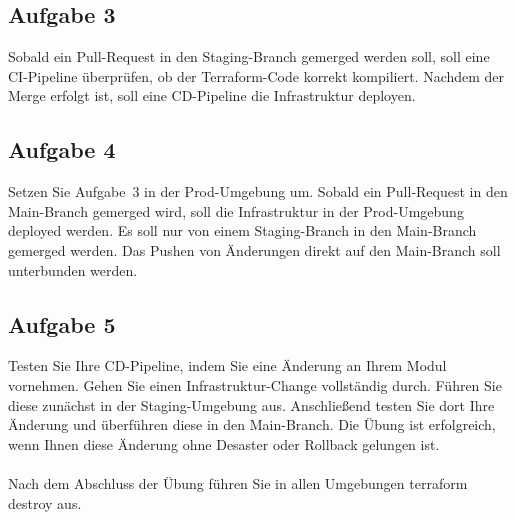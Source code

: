 \documentclass{article}
\begin{document}
    \subsection{Aufgabe 3}
    Sobald ein Pull-Request in den Staging-Branch gemerged werden soll, soll eine CI-Pipeline überprüfen, ob der Terraform-Code korrekt kompiliert.
    Nachdem der Merge erfolgt ist, soll eine CD-Pipeline die Infrastruktur deployen.

    \subsection{Aufgabe 4}
    Setzen Sie Aufgabe 3 in der Prod-Umgebung um. Sobald ein Pull-Request in den Main-Branch gemerged wird, soll die Infrastruktur in der Prod-Umgebung deployed werden.
    Es soll nur von einem Staging-Branch in den Main-Branch gemerged werden. Das Pushen von Änderungen direkt auf den Main-Branch soll unterbunden werden.

    \subsection{Aufgabe 5}
    Testen Sie Ihre CD-Pipeline, indem Sie eine Änderung an Ihrem Modul vornehmen.
    Gehen Sie einen Infrastruktur-Change vollständig durch. Führen Sie diese zunächst in der Staging-Umgebung aus. Anschließend testen Sie dort Ihre Änderung und überführen diese in den Main-Branch.
    Die Übung ist erfolgreich, wenn Ihnen diese Änderung ohne Desaster oder Rollback gelungen ist. \\ \\
    Nach dem Abschluss der Übung führen Sie in allen Umgebungen terraform destroy aus.
\end{document}
